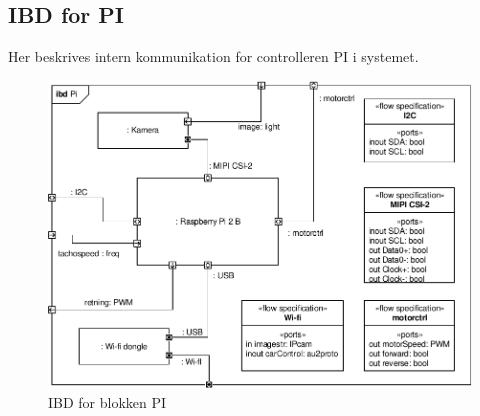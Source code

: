 \subsection{IBD for PI}

Her beskrives intern kommunikation for controlleren PI i systemet. 

\begin{figure}[h]
\centering
\includegraphics[scale=1]{../fig/diagrammer/bil/ibd_pi.pdf}
\caption{IBD for blokken PI}
\label{fig:ibd_pi}
\end{figure}
